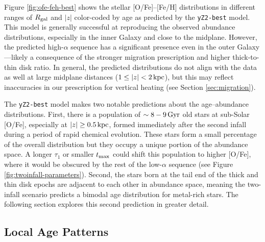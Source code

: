 \documentclass[twocolumn,twocolappendix,linenumbers]{aastex631}
\newcommand{\kpc}{\,{\rm kpc}}
\newcommand{\Gyr}{\,{\rm Gyr}}
\begin{document}
Figure \ref{fig:ofe-feh-best} shows the stellar [O/Fe]--[Fe/H] distributions in different ranges of $R_{\rm gal}$ and $|z|$ color-coded by age as predicted by the {\tt yZ2-best} model. This model is generally successful at reproducing the observed abundance distributions, especially in the inner Galaxy and close to the midplane. However, the predicted high-$\alpha$ sequence has a significant presence even in the outer Galaxy---likely a consequence of the stronger migration prescription and higher thick-to-thin disk ratio. In general, the predicted distributions do not align with the data as well at large midplane distances ($1\leq|z|<2\kpc$), but this may reflect inaccuracies in our prescription for vertical heating (see Section \ref{sec:migration}).

The {\tt yZ2-best} model makes two notable predictions about the age--abundance distributions. First, there is a population of $\sim8-9\Gyr$ old stars at sub-Solar [O/Fe], especially at $|z|\ge0.5\kpc$, formed immediately after the second infall during a period of rapid chemical evolution. These stars form a small percentage of the overall distribution \citep[see also Figure 11 from][]{spitoni_remind_2024} but they occupy a unique portion of the abundance space. A longer $\tau_1$ or smaller $t_{\rm max}$ could shift this population to higher [O/Fe], where it would be obscured by the rest of the low-$\alpha$ sequence (see Figure \ref{fig:twoinfall-parameters}). Second, the stars born at the tail end of the thick and thin disk epochs are adjacent to each other in abundance space, meaning the two-infall scenario predicts a bimodal age distribution for metal-rich stars. The following section explores this second prediction in greater detail.

\subsection{Local Age Patterns}
\end{document}

